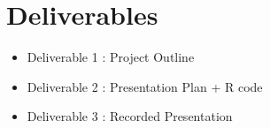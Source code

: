 \documentclass[12pt]{article}
\begin{document}
\section*{Deliverables}
\begin{itemize}
    \item Deliverable 1 : Project Outline 
    \item Deliverable 2 : Presentation Plan + R code
    \item Deliverable 3 : Recorded Presentation 
\end{itemize}
\end{document}
